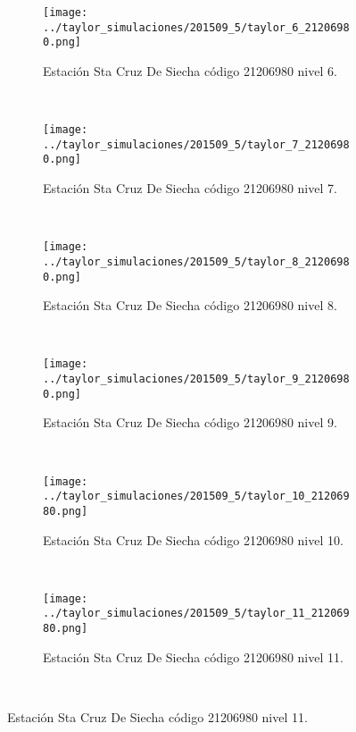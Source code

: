 \begin{figure}[H]\ContinuedFloat
\centering
\begin{subfigure}[normla]{0.4\textwidth}
\texttt{[image: ../taylor\_simulaciones/201509\_5/taylor\_6\_21206980.png]}
\caption{Estación Sta Cruz De Siecha  código 21206980 nivel 6.}
\end{subfigure}
~
\begin{subfigure}[normla]{0.4\textwidth}
\texttt{[image: ../taylor\_simulaciones/201509\_5/taylor\_7\_21206980.png]}
\caption{Estación Sta Cruz De Siecha  código 21206980 nivel 7.}
\end{subfigure}
~
\begin{subfigure}[normla]{0.4\textwidth}
\texttt{[image: ../taylor\_simulaciones/201509\_5/taylor\_8\_21206980.png]}
\caption{Estación Sta Cruz De Siecha  código 21206980 nivel 8.}
\end{subfigure}
~
\begin{subfigure}[normla]{0.4\textwidth}
\texttt{[image: ../taylor\_simulaciones/201509\_5/taylor\_9\_21206980.png]}
\caption{Estación Sta Cruz De Siecha  código 21206980 nivel 9.}
\end{subfigure}
~
\begin{subfigure}[normla]{0.4\textwidth}
\texttt{[image: ../taylor\_simulaciones/201509\_5/taylor\_10\_21206980.png]}
\caption{Estación Sta Cruz De Siecha  código 21206980 nivel 10.}
\end{subfigure}
~
\begin{subfigure}[normla]{0.4\textwidth}
\texttt{[image: ../taylor\_simulaciones/201509\_5/taylor\_11\_21206980.png]}
\caption{Estación Sta Cruz De Siecha  código 21206980 nivel 11.}
\end{subfigure}
~
\end{figure}
           
